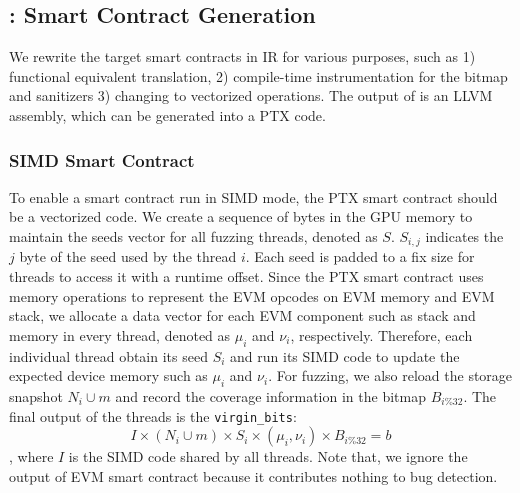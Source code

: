 \subsection{{\translator}: Smart Contract Generation}
\label{design:translator}
We rewrite the target smart contracts in IR for various purposes, such as 1) functional equivalent translation, 2) compile-time instrumentation for the bitmap and sanitizers 3) changing to vectorized operations.
%
The output of {\translator} is an LLVM assembly, which can be generated into a PTX code.
%

\subsubsection{SIMD Smart Contract}
To enable a smart contract run in SIMD mode, the PTX smart contract should be a vectorized code\cite{nuzman2011vapor}. 
%
We create a sequence of bytes in the GPU memory to maintain the seeds vector for all fuzzing threads, denoted as $S$.  
$S_{i,j}$ indicates the $j$ byte of the seed used by the thread $i$.  
Each seed is padded to a fix size for threads to access it with a runtime offset.
Since the PTX smart contract uses memory operations to represent the EVM opcodes on EVM memory and EVM stack, we allocate a data vector for each EVM component such as stack and memory in every thread, denoted as $\mu_i$ and $\nu_i$, respectively. 
Therefore, each individual thread obtain its seed $S_i$ and run its SIMD code to update the expected device memory such as $\mu_i$ and $\nu_i$. For fuzzing, we also reload the storage snapshot $N_i \cup m$ and record the coverage information in the bitmap $B_{i\%32}$. The final output of the threads is the \texttt{virgin\_bits}:
$$
I \times (N_i \cup m) \times S_i \times (\mu_i, \nu_i) \times B_{i\%32}= b
$$
, where $I$ is the SIMD code shared by all threads. 
Note that, we ignore the output of EVM smart contract because it contributes nothing to bug detection.
%

